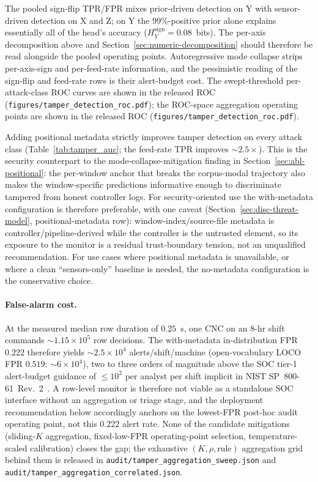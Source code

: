\documentclass[sensors,article,submit,moreauthors,pdftex]{Definitions/mdpi}
\begin{document}
The pooled sign-flip TPR/FPR mixes prior-driven detection on Y with sensor-driven detection on X and Z; on Y the $99\%$-positive prior alone explains essentially all of the head's accuracy ($H_{Y}^{\text{sign}}=0.08$~bits). The per-axis decomposition above and Section~\ref{sec:numeric-decomposition} should therefore be read alongside the pooled operating points. Autoregressive mode collapse strips per-axis-sign and per-feed-rate information, and the pessimistic reading of the sign-flip and feed-rate rows is their alert-budget cost. The swept-threshold per-attack-class ROC curves are shown in the released ROC (\texttt{figures/tamper\_detection\_roc.pdf}); the ROC-space aggregation operating points are shown in the released ROC (\texttt{figures/tamper\_detection\_roc.pdf}).



Adding positional metadata strictly improves tamper detection on every attack class (Table~\ref{tab:tamper_auc}; the feed-rate TPR improves $\sim$$2.5\times$). This is the security counterpart to the mode-collapse-mitigation finding in Section~\ref{sec:abl-positional}: the per-window anchor that breaks the corpus-modal trajectory also makes the window-specific predictions informative enough to discriminate tampered from honest controller logs. For security-oriented use the with-metadata configuration is therefore preferable, with one caveat (Section~\ref{sec:disc-threat-model}, positional-metadata row): window-index/source-file metadata is controller/pipeline-derived while the controller is the untrusted element, so its exposure to the monitor is a residual trust-boundary tension, not an unqualified recommendation. For use cases where positional metadata is unavailable, or where a clean ``sensors-only'' baseline is needed, the no-metadata configuration is the conservative choice.

\paragraph{False-alarm cost.} At the measured median row duration of $0.25$~s, one CNC on an 8-hr shift commands $\sim$$1.15\!\times\!10^{5}$ row decisions. The with-metadata in-distribution FPR $0.222$ therefore yields $\sim$$2.5\!\times\!10^{4}$ alerts/shift/machine (open-vocabulary LOCO FPR $0.519$: $\sim$$6\!\times\!10^{4}$), two to three orders of magnitude above the SOC tier-1 alert-budget guidance of $\le\!10^{2}$ per analyst per shift implicit in NIST SP~800-61~Rev.~2~\cite{nist2012sp80061}. A row-level monitor is therefore not viable as a standalone SOC interface without an aggregation or triage stage, and the deployment recommendation below accordingly anchors on the lowest-FPR post-hoc audit operating point, not this $0.222$ alert rate. None of the candidate mitigations (sliding-$K$ aggregation, fixed-low-FPR operating-point selection, temperature-scaled calibration) closes the gap; the exhaustive $(K,\rho,\text{rule})$ aggregation grid behind them is released in \texttt{audit/tamper\_aggregation\_sweep.json} and \texttt{audit/tamper\_aggregation\_correlated.json}.
\end{document}
